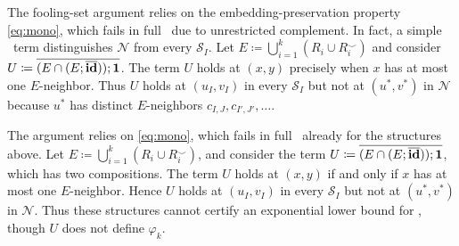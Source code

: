 \smallskip
{}
The fooling-set argument relies on the embedding-preservation property \eqref{eq:mono},
which fails in full \CoR\ due to unrestricted complement.
In fact, a simple \CoR\ term distinguishes  $\mathcal N$ from every $\mathcal S_I$.
Let $E\coloneqq\bigcup_{i=1}^k(R_i\cup R_i^\smile)$
and consider
$U\coloneqq\overline{(E\cap(E;\overline{\mathbf{id}}));\mathbf{1}}$.
The term $U$ holds at $(x,y)$ precisely when
$x$ has at most one $E$-neighbor.
Thus $U$ holds at $(u_I,v_I)$ in every
$\mathcal S_I$ but not at $(u^*,v^*)$ in
$\mathcal N$
because $u^*$ has distinct $E$-neighbors
$c_{I,J}, c_{I',J'}, \ldots$.


The argument relies on \eqref{eq:mono}, which fails in full \CoR\ already for the structures above.
Let $E\coloneqq\bigcup_{i=1}^k(R_i\cup R_i^\smile)$, and consider the term
$U\coloneqq\overline{(E\cap(E;\overline{\mathbf{id}}));\mathbf{1}}$, which has two compositions. The term $U$ holds at $(x,y)$ if and only if
$x$ has at most one $E$-neighbor. Hence $U$ holds at $(u_I,v_I)$ in every
$\mathcal S_I$ but not at $(u^*,v^*)$ in $\mathcal N$.
Thus these structures cannot certify an exponential lower bound for
\CoR, though $U$ does not define $\varphi_k$.
\fi
